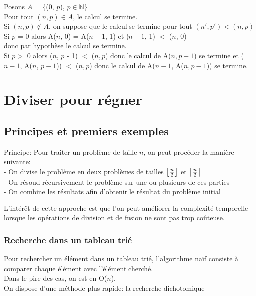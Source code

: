 \documentclass{article}
\DeclarePairedDelimiter\ceil{\lceil}{\rceil}
\DeclarePairedDelimiter\floor{\lfloor}{\rfloor}
\begin{document}
				Posons $A$ = \{(0, $p$), $p \in \mathbb{N}$\}\\
				Pour tout $(n, p) \in A$, le calcul se termine.\\
				Si $(n, p) \notin A$, on suppose que le calcul se termine pour tout $(n', p') < (n, p)$\\
				Si $p$ = 0 alors A($n$, 0) = A($n - 1$, 1) et ($n - 1$, 1) $<$ ($n$, 0)\\
				donc par hypothèse le calcul se termine.\\
				
				Si $p >$ 0 alors ($n$, $p$ - 1) $<$ ($n, p$) donc le calcul de A($n, p - 1$) se termine et ($n - 1$, A($n$, $p - 1$)) $<$ ($n, p$) donc le calcul de A($n - 1$, A($n, p - 1$)) se termine.
				
	\section{Diviser pour régner}
			
		\subsection{Principes et premiers exemples}
			
			Principe: Pour traiter un problème de taille $n$, on peut procéder la manière suivante:\\
			- On divise le problème en deux problèmes de tailles   
    $\floor*{\frac{n}{2}}$ et $\ceil*{\frac{n}{2}}$\\
			- On résoud récursivement le problème sur une ou plusieurs de ces parties\\
			- On combine les résultats afin d'obtenir le résultat du problème initial
			
			L'intérêt de cette approche est que l'on peut améliorer la complexité temporelle lorsque les opérations de division et de fusion ne sont pas trop coûteuse.
			
			\subsubsection{Recherche dans un tableau trié}
			
				Pour rechercher un élément dans un tableau trié, l'algorithme naïf consiste à comparer chaque élément avec l'élément cherché.\\
				Dans le pire des cas, on est en O($n$).\\
				On dispose d'une méthode plus rapide: la recherche dichotomique
				
\end{document}
